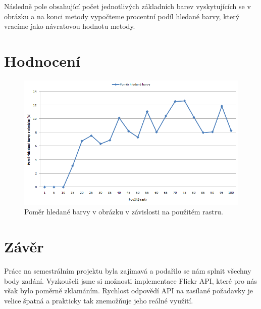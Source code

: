 \documentclass[12pt]{article}
\begin{document}
Následně pole obsahující počet jednotlivých základních barev vyskytujících se v obrázku a na konci metody vypočteme procentní podíl hledané barvy, který vracíme jako návratovou hodnotu metody.

\section{Hodnocení}
\begin{figure}[ht]
\centering       
\includegraphics[scale=0.7]{graf.png}
\caption{Poměr hledané barvy v obrázku v závislosti na použitém rastru.}
\label{graf}
\end{figure}

\section{Závěr}
Práce na semestrálním projektu byla zajímavá a podařilo se nám splnit všechny body zadání. Vyzkoušeli jsme si možnosti implementace Flickr API, které pro nás však bylo poměrně zklamáním. Rychlost odpovědí API na zasílané požadavky je velice špatná a prakticky tak znemožňuje jeho reálné využití.
\end{document}
